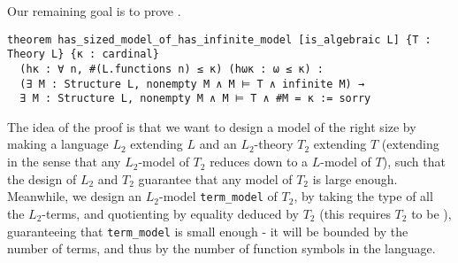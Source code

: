 Our remaining goal is to prove
.

\begin{lstlisting}
theorem has_sized_model_of_has_infinite_model [is_algebraic L] {T : Theory L} {κ : cardinal}
  (hκ : ∀ n, #(L.functions n) ≤ κ) (hωκ : ω ≤ κ) :
  (∃ M : Structure L, nonempty M ∧ M ⊨ T ∧ infinite M) →
  ∃ M : Structure L, nonempty M ∧ M ⊨ T ∧ #M = κ := sorry \end{lstlisting}

The idea of the proof is that we want to design a model of the right size
by making a language $L_{2}$ extending $L$ and an $L_{2}$-theory $T_{2}$ extending $T$
(extending in the sense that any $L_{2}$-model of $T_{2}$ reduces down to a $L$-model of $T$),
such that the design of $L_{2}$ and $T_{2}$ guarantee that any model of $T_{2}$ is large enough.
Meanwhile, we design an $L_{2}$-model \texttt{term\_model} of $T_{2}$,
by taking the type of all the $L_{2}$-terms,
and quotienting by equality deduced by $T_{2}$ (this requires $T_{2}$ to be ),
guaranteeing that \texttt{term\_model} is small enough
- it will be bounded by the number of terms,
and thus by the number of function symbols in the language.
